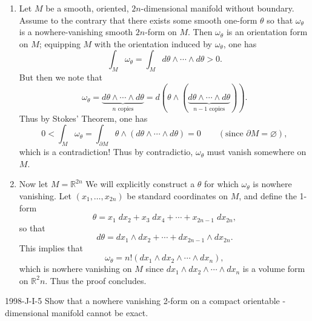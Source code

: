 \documentclass{article}
\begin{document}
	\begin{enumerate}[itemsep =-2pt,label = (\alph{*})]
		\item Let $M$ be a smooth, oriented, $2n$-dimensional manifold without boundary. Assume to the contrary that there exists some smooth one-form $\theta$ so that $\omega_{\theta}$ is a nowhere-vanishing smooth $2n$-form on $M$. Then $\omega_\theta$ is an orientation form on $M$; equipping $M$ with the orientation induced by $\omega_{\theta}$, one has 
		\begin{equation*}
			\int_{M}\omega_{\theta} = \int_{M}d\theta \wedge \dotsm \wedge d\theta > 0.
		\end{equation*}
		But then we note that 
		\begin{equation*}
			\omega_\theta = \underbrace{d\theta \wedge \dotsm \wedge d\theta}_{n \text{ copies}} = d(\theta \wedge (\underbrace{d\theta \wedge \dotsm\wedge d\theta}_{n - 1 \text{ copies}})). 
		\end{equation*}
		Thus by Stokes' Theorem, one has 
		\begin{equation*}
			0 < \int_{M}\omega_\theta = \int_{\partial M}\theta \wedge (d\theta \wedge \dotsm \wedge d\theta) = 0 \qquad (\text{since $\partial M= \varnothing$}), 
		\end{equation*}
		which is a contradiction! Thus by contradictio, $\omega_\theta$ must vanish somewhere on $M$. 
		\item Now let $M = \mathbb{R}^{2n}$  We will explicitly construct a $\theta$ for which $\omega_\theta$ is nowhere vanishing. Let $(x_1,\ldots, x_{2n})$ be standard coordinates on $M$, and define the 1-form 
		\begin{equation*}
			\theta = x_1\;dx_2 + x_3\;dx_4 + \dotsm + x_{2n-1}\;dx_{2n}, 
		\end{equation*}
		so that 
		\begin{equation*}
			d\theta = dx_1\wedge dx_2 + \dotsm + dx_{2n-1} \wedge dx_{2n}. 
		\end{equation*}
		This implies that 
		\begin{equation*}
			\omega_\theta = n!(dx_1 \wedge dx_2 \wedge \dotsm \wedge dx_n), 
		\end{equation*}
		which is nowhere vanishing on $M$ since $dx_1 \wedge dx_2 \wedge \dotsm \wedge dx_n$ is a volume form on $\mathbb{R}^2n$. Thus the proof concludes. 
	\end{enumerate}
	
	\begin{prb}{1998-J-I-5}
		Show that a nowhere vanishing 2-form on a compact orientable -dimensional manifold cannot be exact. 
	\end{prb}
	
\end{document}
